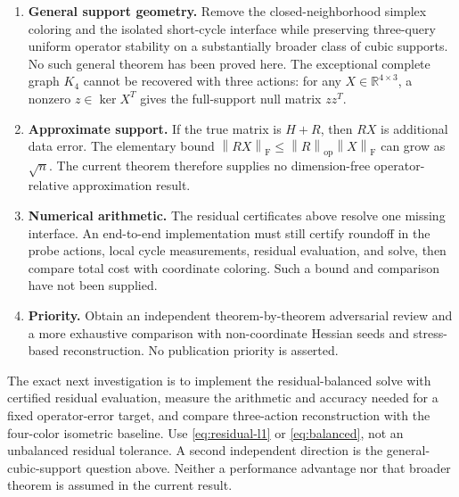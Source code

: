 \documentclass[11pt]{article}
\theoremstyle{remark}\newtheorem{remark}[theorem]{Remark}
\newcommand{\R}{\mathbb R}
\newcommand{\op}{\mathrm{op}}
\newcommand{\F}{\mathrm F}
\newcommand{\norm}[1]{\left\lVert #1\right\rVert}
\begin{document}
\begin{enumerate}
\item \textbf{General support geometry.} Remove the closed-neighborhood simplex coloring and the isolated short-cycle interface while preserving three-query uniform operator stability on a substantially broader class of cubic supports. No such general theorem has been proved here. The exceptional complete graph $K_4$ cannot be recovered with three actions: for any $X\in\R^{4\times3}$, a nonzero $z\in\ker X^T$ gives the full-support null matrix $zz^T$.
\item \textbf{Approximate support.} If the true matrix is $H+R$, then $RX$ is additional data error. The elementary bound $\norm{RX}_{\F}\leq\norm R_{\op}\norm X_{\F}$ can grow as $\sqrt n$. The current theorem therefore supplies no dimension-free operator-relative approximation result.
\item \textbf{Numerical arithmetic.} The residual certificates above resolve one missing interface. An end-to-end implementation must still certify roundoff in the probe actions, local cycle measurements, residual evaluation, and solve, then compare total cost with coordinate coloring. Such a bound and comparison have not been supplied.
\item \textbf{Priority.} Obtain an independent theorem-by-theorem adversarial review and a more exhaustive comparison with non-coordinate Hessian seeds and stress-based reconstruction. No publication priority is asserted.
\end{enumerate}

The exact next investigation is to implement the residual-balanced solve with certified residual evaluation, measure the arithmetic and accuracy needed for a fixed operator-error target, and compare three-action reconstruction with the four-color isometric baseline. Use \eqref{eq:residual-l1} or \eqref{eq:balanced}, not an unbalanced residual tolerance. A second independent direction is the general-cubic-support question above. Neither a performance advantage nor that broader theorem is assumed in the current result.
\end{document}
